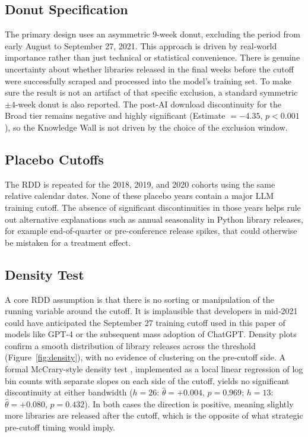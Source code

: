 \documentclass[12pt, a4paper]{report}
\begin{document}
\subsection{Donut Specification}\label{subsec:rob-donut}
The primary design uses an asymmetric 9-week donut, excluding the period from early August to September 27, 2021. This approach is driven by real-world importance rather than just technical or statistical convenience. There is genuine uncertainty about whether libraries released in the final weeks before the cutoff were successfully scraped and processed into the model's training set. To make sure the result is not an artifact of that specific exclusion, a standard symmetric $\pm 4$-week donut is also reported. The post-AI download discontinuity for the Broad tier remains negative and highly significant (Estimate $= -4.35$, $p < 0.001$), so the Knowledge Wall is not driven by the choice of the exclusion window.

\subsection{Placebo Cutoffs}\label{subsec:rob-placebo}
The RDD is repeated for the 2018, 2019, and 2020 cohorts using the same relative calendar dates. None of these placebo years contain a major LLM training cutoff. The absence of significant discontinuities in those years helps rule out alternative explanations such as annual seasonality in Python library releases, for example end-of-quarter or pre-conference release spikes, that could otherwise be mistaken for a treatment effect.

\subsection{Density Test}\label{subsec:rob-density}
A core RDD assumption is that there is no sorting or manipulation of the running variable around the cutoff. It is implausible that developers in mid-2021 could have anticipated the September 27 training cutoff used in this paper of models like GPT-4 or the subsequent mass adoption of ChatGPT. Density plots confirm a smooth distribution of library releases across the threshold (Figure~\ref{fig:density}), with no evidence of clustering on the pre-cutoff side. A formal McCrary-style density test \citep{mccrary2008manipulation, cattaneo2020density}, implemented as a local linear regression of log bin counts with separate slopes on each side of the cutoff, yields no significant discontinuity at either bandwidth ($h = 26$: $\hat{\theta} = +0.004$, $p = 0.969$; $h = 13$: $\hat{\theta} = +0.080$, $p = 0.432$). In both cases the direction is positive, meaning slightly more libraries are released after the cutoff, which is the opposite of what strategic pre-cutoff timing would imply.
\end{document}
